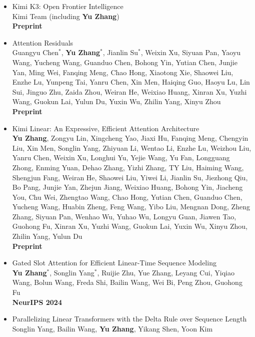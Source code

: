 \documentclass[a4paper,12pt]{article}
\begin{document}
\begin{itemize}[leftmargin=15pt]
      \item Kimi K3: Open Frontier Intelligence \\
            Kimi Team (including \textbf{Yu Zhang}) \\
            \textbf{Preprint}
      \item Attention Residuals \\
            Guangyu Chen$^*$, \textbf{Yu Zhang$^*$}, Jianlin Su$^*$, Weixin Xu, Siyuan Pan, Yaoyu Wang, Yucheng Wang, Guanduo Chen, Bohong Yin, Yutian Chen, Junjie Yan, Ming Wei, Fanqing Meng, Chao Hong, Xiaotong Xie, Shaowei Liu, Enzhe Lu, Yunpeng Tai, Yanru Chen, Xin Men, Haiqing Guo, Haoyu Lu, Lin Sui, Jinguo Zhu, Zaida Zhou, Weiran He, Weixiao Huang, Xinran Xu, Yuzhi Wang, Guokun Lai, Yulun Du, Yuxin Wu, Zhilin Yang, Xinyu Zhou \\
            \textbf{Preprint}
      \item Kimi Linear: An Expressive, Efficient Attention Architecture \\
            \textbf{Yu Zhang}, Zongyu Lin, Xingcheng Yao, Jiaxi Hu, Fanqing Meng, Chengyin Liu, Xin Men, Songlin Yang, Zhiyuan Li, Wentao Li, Enzhe Lu, Weizhou Liu, Yanru Chen, Weixin Xu, Longhui Yu, Yejie Wang, Yu Fan, Longguang Zhong, Enming Yuan, Dehao Zhang, Yizhi Zhang, TY Liu, Haiming Wang, Shengjun Fang, Weiran He, Shaowei Liu, Yiwei Li, Jianlin Su, Jiezhong Qiu, Bo Pang, Junjie Yan, Zhejun Jiang, Weixiao Huang, Bohong Yin, Jiacheng You, Chu Wei, Zhengtao Wang, Chao Hong, Yutian Chen, Guanduo Chen, Yucheng Wang, Huabin Zheng, Feng Wang, Yibo Liu, Mengnan Dong, Zheng Zhang, Siyuan Pan, Wenhao Wu, Yuhao Wu, Longyu Guan, Jiawen Tao, Guohong Fu, Xinran Xu, Yuzhi Wang, Guokun Lai, Yuxin Wu, Xinyu Zhou, Zhilin Yang, Yulun Du \\
            \textbf{Preprint}
      \item Gated Slot Attention for Efficient Linear-Time Sequence Modeling \\
            \textbf{Yu Zhang$^*$}, Songlin Yang$^*$, Ruijie Zhu, Yue Zhang, Leyang Cui, Yiqiao Wang, Bolun Wang, Freda Shi, Bailin Wang, Wei Bi, Peng Zhou, Guohong Fu \\
            \textbf{NeurIPS 2024}
      \item Parallelizing Linear Transformers with the Delta Rule over Sequence Length \\
            Songlin Yang, Bailin Wang, \textbf{Yu Zhang}, Yikang Shen, Yoon Kim \\

\end{itemize}
\end{document}
